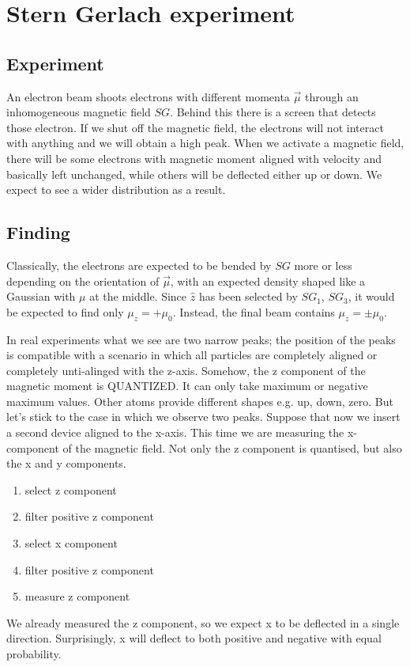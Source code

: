 \section{Stern Gerlach experiment}

  \subsection{Experiment}
  An electron beam shoots electrons with different momenta $\vec{\mu}$ through an inhomogeneous magnetic field $SG$.
  Behind this there is a screen that detects those electron. If we shut off the magnetic field, the electrons will not interact with anything and we will obtain a high peak. When we activate a magnetic field, there will be some electrons with magnetic moment aligned with velocity and basically left unchanged, while others will be deflected either up or down. We expect to see a wider distribution as a result.

  \subsection{Finding}
  Classically, the electrons are expected to be bended by $SG$ more or less depending on the orientation of $\vec{\mu}$, with an expected density shaped like a Gaussian with $\mu$ at the middle.
  Since $\hat{z}$ has been selected by $SG_1$, $SG_3$, it would be expected to find only $\mu_z = + \mu_0$. Instead, the final beam contains $\mu_z =\pm \mu_0$.

In real experiments what we see are two narrow peaks; the position of the peaks is compatible with a scenario in which all particles are completely aligned or completely unti-alinged with the z-axis. Somehow, the z component of the magnetic moment is QUANTIZED. It can only take maximum or negative maximum values. Other atoms provide different shapes e.g. up, down, zero. But let’s stick to the case in which we observe two peaks.
Suppose that now we insert a second device aligned to the x-axis. This time we are measuring the x-component of the magnetic field. Not only the z component is quantised, but also the x and y components.
\begin{enumerate}
  \item select z component
  \item filter positive z component
  \item select x component
  \item filter positive z component
  \item measure z component
 \end{enumerate}
We already measured the z component, so we expect x to be deflected in a single direction. Surprisingly, x will deflect to both positive and negative with equal probability. 

